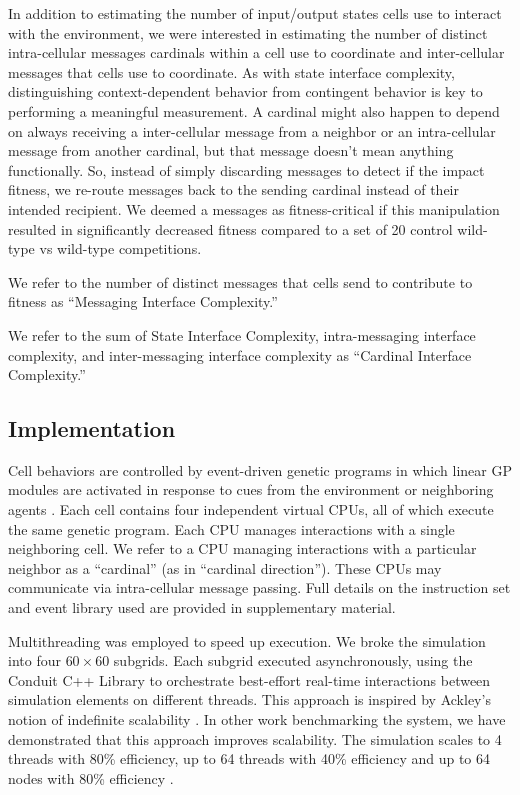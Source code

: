 In addition to estimating the number of input/output states cells use to interact with the environment, we were interested in estimating the number of distinct intra-cellular messages cardinals within a cell use to coordinate and inter-cellular messages that cells use to coordinate.
As with state interface complexity, distinguishing context-dependent behavior from contingent behavior is key to performing a meaningful measurement.
A cardinal might also happen to depend on always receiving a inter-cellular message from a neighbor or an intra-cellular message from another cardinal, but that message doesn't mean anything functionally.
So, instead of simply discarding messages to detect if the impact fitness, we re-route messages back to the sending cardinal instead of their intended recipient. 
We deemed a messages as fitness-critical if this manipulation resulted in significantly decreased fitness compared to a set of 20 control wild-type vs wild-type competitions.

We refer to the number of distinct messages that cells send to contribute to fitness as ``Messaging Interface Complexity.''

We refer to the sum of State Interface Complexity, intra-messaging interface complexity, and inter-messaging interface complexity as ``Cardinal Interface Complexity.''

\subsection{Implementation}

Cell behaviors are controlled by event-driven genetic programs in which linear GP modules are activated in response to cues from the environment or neighboring agents \citep{lalejini2018evolving}.
Each cell contains four independent virtual CPUs, all of which execute the same genetic program.
Each CPU manages interactions with a single neighboring cell.
We refer to a CPU managing interactions with a particular neighbor as a ``cardinal'' (as in ``cardinal direction'').
These CPUs may communicate via intra-cellular message passing.
Full details on the instruction set and event library used are provided in supplementary material.

Multithreading was employed to speed up execution.
We broke the simulation into four $60\times60$ subgrids.
Each subgrid executed asynchronously, using the Conduit C++ Library to orchestrate best-effort real-time interactions between simulation elements on different threads.
This approach is inspired by Ackley's notion of indefinite scalability \citep{ackley2014indefinitely}.
In other work benchmarking the system, we have demonstrated that this approach improves scalability.
The simulation scales to 4 threads with 80\% efficiency, up to 64 threads with 40\% efficiency and up to 64 nodes with 80\% efficiency \citep{moreno2021conduit}.

